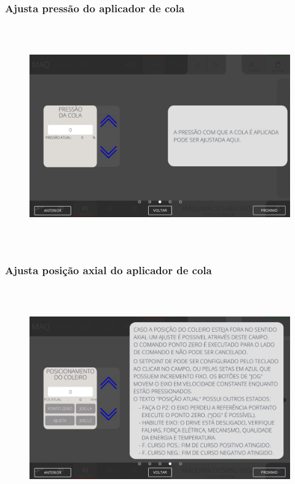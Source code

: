 \newpage
\thispagestyle{fancy}
\vspace*{40 pt}
\subsubsection{\small{Ajusta pressão do aplicador de cola}}\label{telaAjustesDobraAjustaPressaoAplicadorCola}
\vspace*{\fill}
\begin{figure}[h]
  \centering
  \includegraphics[width=576px,height=360px]{src/imagesFlexo/07-fold/settings/e-3.png}
\end{figure}
\vspace*{\fill}

\newpage
\thispagestyle{fancy}
\vspace*{40 pt}
\subsubsection{\small{Ajusta posição axial do aplicador de cola}}\label{telaAjustesDobraAjustaPosicaoAxialAplicadorCola}
\vspace*{\fill}
\begin{figure}[h]
  \centering
  \includegraphics[width=576px,height=360px]{src/imagesFlexo/07-fold/settings/e-4.png}
\end{figure}
\vspace*{\fill}

